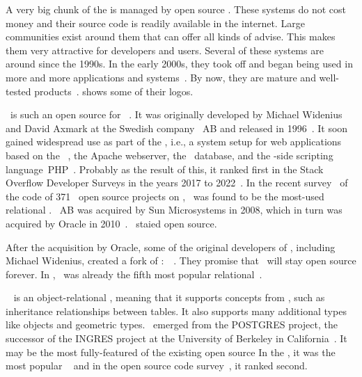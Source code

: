 %
A very big chunk of the  is managed by open source .
These systems do not cost money and their source code is readily available in the internet.
Large communities exist around them that can offer all kinds of advise.
This makes them very attractive for developers and users.
Several of these systems are around since the 1990s.
In the early 2000s, they took off and began being used in more and more applications and systems~\cite{P2004OSDMITM}.
By now, they are mature and well-tested products~\cite{C20245YOQ}.
 shows some of their logos.

\mysql\ is such an open source  for ~\cite{WAM2002MRMDFTS,TA2024DDAMWPAM,BT2021HPM,RGS2021BTOTONAMDFPC,D2015LMAM}.
It was originally developed by Michael Widenius and David Axmark at the Swedish company \mysql~AB and released in 1996~\cite{C20245YOQ}.
It soon gained widespread use as part of the \lampStack, i.e., a system setup for web applications based on the \linux\ , the Apache webserver, the \mysql\ database, and the -side scripting language~PHP~\cite{C2022HAFTLS,H2020ULU2E}.
Probably as the result of this, it ranked first in the Stack Overflow Developer Surveys in the years 2017 to 2022~\cite{SE:SO:2024DS}.
In the recent survey~\cite{PMPVEPWGSMB2025ATAODMSTTHOOSP} of the code of 371~ open source projects on \github, \mysql\ was found to be the most-used relational .
\mysql~AB was acquired by Sun Microsystems in 2008, which in turn was acquired by Oracle in 2010~\cite{C20245YOQ}.
\mysql\ staied open source.

After the acquisition by Oracle, some of the original developers of \mysql, including Michael Widenius, created a fork of \mysql:~\mariadb~\cite{R2014MM,B2019LTMEELFFSAA,D2015LMAM,AA2018QAWMV1ITSQ,AA2018QAWMV2IDQ}.
They promise that \mariadb\ will stay open source forever.
In \cite{PMPVEPWGSMB2025ATAODMSTTHOOSP}, \mariadb\ was already the fifth most popular relational~.

\postgresql~\cite{TA2024DDAMWPAM,FP2023LP,OH2017PUAR,B2024PELUYDW} is an object-relational , meaning that it supports concepts from , such as inheritance relationships between tables.
It also supports many additional types like  objects and geometric types.
\postgresql\ emerged from the POSTGRES project, the successor of the INGRES project at the University of Berkeley in California~\cite{C20245YOQ}.
It may be the most fully-featured of the existing open source  
In the , it was the most popular ~\cite{SE:SO:2024DS} and in the open source code survey~\cite{PMPVEPWGSMB2025ATAODMSTTHOOSP}, it ranked second.

